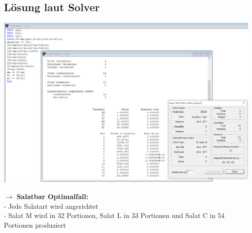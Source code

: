 \documentclass[a4paper,11pt]{article}
\begin{document}
\subsection*{Lösung laut Solver}
\begin{centering}
	\includegraphics[width=1\linewidth]{src/blatt_4_aufgabe_2_loesung_solver.PNG}
\end{centering}

$\to$ \textbf{Salatbar Optimalfall:} \\
- Jede Salatart wird angerichtet \\
- Salat M wird in 32 Portionen, Salat L in 33 Portionen und Salat C in 54 Portionen produziert
\end{document}
